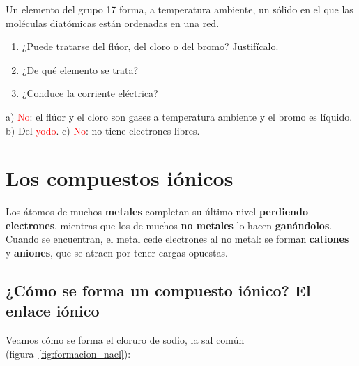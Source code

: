 \begin{exercise}
    Un elemento del grupo 17 forma, a temperatura ambiente, un sólido en el que las moléculas diatómicas están ordenadas en una red.
    \begin{enumerate}[label=\alph*)]
        \item ¿Puede tratarse del flúor, del cloro o del bromo? Justifícalo.
        \item ¿De qué elemento se trata?
        \item ¿Conduce la corriente eléctrica?
    \end{enumerate}
    \begin{solu}
        a) \textcolor{red}{No}: el flúor y el cloro son gases a temperatura ambiente y el bromo es líquido. b) Del \textcolor{red}{yodo}. c) \textcolor{red}{No}: no tiene electrones libres.
    \end{solu}
\end{exercise}

\section{Los compuestos iónicos}

Los átomos de muchos \textbf{metales} completan su último nivel \textbf{perdiendo electrones}, mientras que los de muchos \textbf{no metales} lo hacen \textbf{ganándolos}. Cuando se encuentran, el metal cede electrones al no metal: se forman \textbf{cationes} y \textbf{aniones}, que se atraen por tener cargas opuestas.

\subsection{¿Cómo se forma un compuesto iónico? El enlace iónico}

Veamos cómo se forma el cloruro de sodio, la sal común (figura~\ref{fig:formacion_nacl}):

